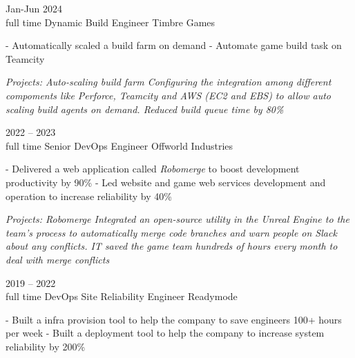 \documentclass[9pt]{developercv} %
\begin{document}
\begin{entrylist}
	\entry
		{Jan-Jun 2024\\\footnotesize{full time}}
		{Dynamic Build Engineer}
		{Timbre Games}
		{
            - Automatically scaled a build farm on demand \newline
            - Automate game build task on Teamcity\newline

            \textit{Projects: Auto-scaling build farm\newline
            Configuring the integration among different compoments like Perforce, Teamcity and AWS (EC2 and EBS) to allow 
            auto scaling build agents on demand. Reduced build queue time by 80\%\newline}
        }
	\entry
		{2022 -- 2023\\\footnotesize{full time}}
		{Senior DevOps Engineer}
		{Offworld Industries}
		{
            - Delivered a web application called \textit{Robomerge} to boost development productivity by 90\%\newline
            - Led website and game web services development and operation to increase reliability by 40\%\newline

            \textit{Projects: Robomerge\newline
            Integrated an open-source utility in the Unreal Engine to the team’s process to automatically merge code branches and warn people on Slack about any conflicts. IT saved the game team hundreds of hours every month to deal with merge conflicts\newline}
        }
    \entry
		{2019 -- 2022\\\footnotesize{full time}}
		{DevOps Site Reliability Engineer}
		{Readymode}
		{
            - Built a infra provision tool to help the company to save engineers 100+ hours per week\newline
            - Built a deployment tool to help the company to increase system reliability by 200\%\newline

}
\end{entrylist}
\end{document}
